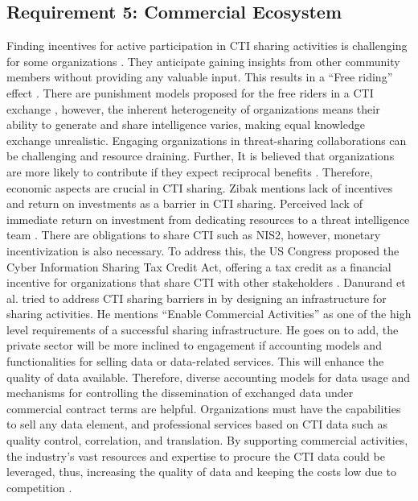 \subsection{Requirement 5: Commercial Ecosystem}
Finding incentives for active participation in CTI sharing activities is challenging for some organizations \cite{zibak_cyber_2019}. They anticipate gaining insights from other community members without providing any valuable input. This results in a “Free riding” effect \cite{wagner_cyber_2019}. There are punishment models proposed for the free riders in a CTI exchange \cite{wagner_cyber_2019}, however, the inherent heterogeneity of organizations means their ability to generate and share intelligence varies, making equal knowledge exchange unrealistic. Engaging organizations in threat-sharing collaborations can be challenging and resource draining. Further, It is believed that organizations are more likely to contribute if they expect reciprocal benefits \cite{wagner_cyber_2019}. Therefore, economic aspects are crucial in CTI sharing. Zibak \cite{zibak_cyber_2019} mentions lack of incentives and return on investments as a barrier in CTI sharing.
Perceived lack of immediate return on investment from dedicating resources to a threat intelligence team \cite{wagner_cyber_2019}. 
There are obligations to share CTI such as NIS2, however, monetary incentivization is also necessary. To address this, the US Congress proposed the Cyber Information Sharing Tax Credit Act, offering a tax credit as a financial incentive for organizations that share CTI with other stakeholders \cite{wagner_cyber_2019}. Danurand et al. tried to address CTI sharing barriers in \cite{dandurand_towards_2013} by designing an infrastructure for sharing activities. He mentions “Enable Commercial Activities” as one of the high level requirements of a successful sharing infrastructure. He goes on to add, the private sector will be more inclined to engagement if accounting models and functionalities for selling data or data-related services. This will enhance the quality of data available. Therefore, diverse accounting models for data usage and mechanisms for controlling the dissemination of exchanged data under commercial contract terms are helpful. Organizations must have the capabilities to sell any data element, and professional services based on CTI data such as quality control, correlation, and translation. By supporting commercial activities, the industry's vast resources and expertise to procure the CTI data could be leveraged, thus, increasing the quality of data and keeping the costs low due to competition \cite{dandurand_towards_2013}.